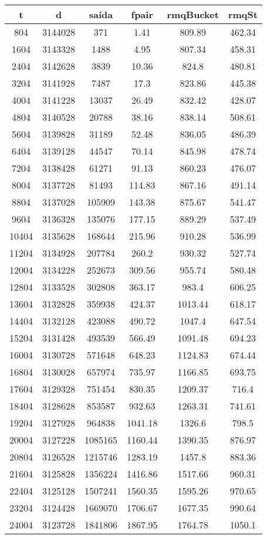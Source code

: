 \begin{tabular}{|c|c|c|c|c|c|}
\hline
\textbf{t} & \textbf{d} & \textbf{saída} & \textbf{fpair} & \textbf{rmqBucket} & \textbf{rmqSt}\\
\hline
804 & 3144028 & 371 & 1.41 & 809.89 & 462.34\\
\hline
1604 & 3143328 & 1488 & 4.95 & 807.34 & 458.31\\
\hline
2404 & 3142628 & 3839 & 10.36 & 824.8 & 480.81\\
\hline
3204 & 3141928 & 7487 & 17.3 & 823.86 & 445.38\\
\hline
4004 & 3141228 & 13037 & 26.49 & 832.42 & 428.07\\
\hline
4804 & 3140528 & 20788 & 38.16 & 838.14 & 508.61\\
\hline
5604 & 3139828 & 31189 & 52.48 & 836.05 & 486.39\\
\hline
6404 & 3139128 & 44547 & 70.14 & 845.98 & 478.74\\
\hline
7204 & 3138428 & 61271 & 91.13 & 860.23 & 476.07\\
\hline
8004 & 3137728 & 81493 & 114.83 & 867.16 & 491.14\\
\hline
8804 & 3137028 & 105909 & 143.38 & 875.67 & 541.47\\
\hline
9604 & 3136328 & 135076 & 177.15 & 889.29 & 537.49\\
\hline
10404 & 3135628 & 168644 & 215.96 & 910.28 & 536.99\\
\hline
11204 & 3134928 & 207784 & 260.2 & 930.32 & 527.74\\
\hline
12004 & 3134228 & 252673 & 309.56 & 955.74 & 580.48\\
\hline
12804 & 3133528 & 302808 & 363.17 & 983.4 & 606.25\\
\hline
13604 & 3132828 & 359938 & 424.37 & 1013.44 & 618.17\\
\hline
14404 & 3132128 & 423088 & 490.72 & 1047.4 & 647.54\\
\hline
15204 & 3131428 & 493539 & 566.49 & 1091.48 & 694.23\\
\hline
16004 & 3130728 & 571648 & 648.23 & 1124.83 & 674.44\\
\hline
16804 & 3130028 & 657974 & 735.97 & 1166.85 & 693.75\\
\hline
17604 & 3129328 & 751454 & 830.35 & 1209.37 & 716.4\\
\hline
18404 & 3128628 & 853587 & 932.63 & 1263.31 & 741.61\\
\hline
19204 & 3127928 & 964838 & 1041.18 & 1326.6 & 798.5\\
\hline
20004 & 3127228 & 1085165 & 1160.44 & 1390.35 & 876.97\\
\hline
20804 & 3126528 & 1215746 & 1283.19 & 1457.8 & 883.36\\
\hline
21604 & 3125828 & 1356224 & 1416.86 & 1517.66 & 960.31\\
\hline
22404 & 3125128 & 1507241 & 1560.35 & 1595.26 & 970.65\\
\hline
23204 & 3124428 & 1669070 & 1706.67 & 1677.35 & 990.64\\
\hline
24004 & 3123728 & 1841806 & 1867.95 & 1764.78 & 1050.1\\
\hline
\end{tabular}

